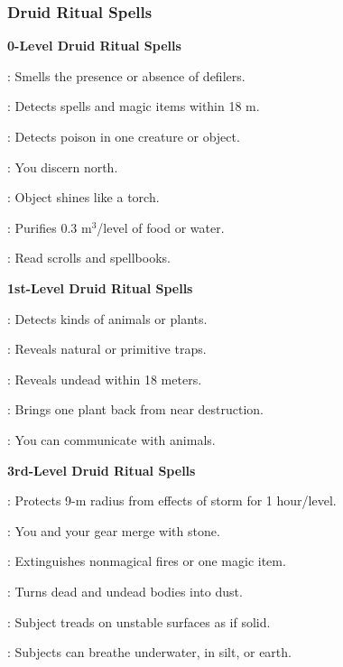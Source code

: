 \subsubsection{Druid Ritual Spells}
\noindent\textbf{0-Level Druid Ritual Spells}
\begin{itemize*}
	\item[] : Smells the presence or absence of defilers.
	\item[] : Detects spells and magic items within 18 m.
	\item[] : Detects poison in one creature or object.
	\item[] : You discern north.
	\item[] : Object shines like a torch.
	\item[] : Purifies 0.3 m$^3$/level of food or water.
	\item[] : Read scrolls and spellbooks.
\end{itemize*}

\noindent\textbf{1st-Level Druid Ritual Spells}
\begin{itemize*}
	\item[] : Detects kinds of animals or plants.
	\item[] : Reveals natural or primitive traps.
	\item[] : Reveals undead within 18 meters.
	\item[] : Brings one plant back from near destruction.
	\item[] : You can communicate with animals.
\end{itemize*}

\noindent\textbf{3rd-Level Druid Ritual Spells}
\begin{itemize*}
	\item[] : Protects 9-m radius from effects of storm for 1 hour/level.%
	\item[] : You and your gear merge with stone.
	\item[] : Extinguishes nonmagical fires or one magic item.
	\item[] : Turns dead and undead bodies into dust.
	\item[] : Subject treads on unstable surfaces as if solid.
	\item[] : Subjects can breathe underwater, in silt, or earth.
\end{itemize*}

